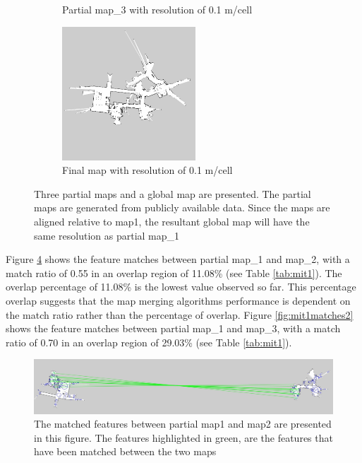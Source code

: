 \begin{figure}[H]
\begin{subfigure}{0.5\textwidth}
\caption{Partial map\_3 with resolution of 0.1 m/cell}
\label{fig:mit13}
\end{subfigure}
\begin{subfigure}{0.5\textwidth}
\centering
\includegraphics[width=0.9\linewidth, height=5cm]{figs/mit_results/a/final_map.jpg} 
\caption{Final map with resolution of 0.1 m/cell}
\label{fig:mit14}
\end{subfigure}
\caption{Three partial maps and a global map are presented. The partial maps are generated from publicly available data.  Since the maps are aligned relative to map1, the resultant global map will have the same resolution as partial map\_1}
\label{fig:mit1}
\end{figure}


Figure \ref{fig:mit1matches1} shows the feature matches between partial map\_1 and map\_2, with a match ratio of 0.55 in an overlap region of 11.08\% (see Table \ref{tab:mit1}). The overlap percentage of 11.08\% is the lowest value observed so far. This percentage overlap suggests that the map merging algorithms performance is dependent on the match ratio rather than the percentage of overlap. Figure \ref{fig:mit1matches2} shows the feature matches between partial map\_1 and map\_3, with a match ratio of 0.70 in an overlap region of 29.03\% (see Table \ref{tab:mit1}).


\begin{figure}[H]
    \centering
    \includegraphics[width=1\textwidth]{figs/mit_results/a/matchesPartialMap1Map2.jpg}
    \caption{The matched features between partial map1 and map2 are presented in this figure. The features highlighted in green, are the features that have been matched between the two maps}
    \label{fig:mit1matches1}
\end{figure} 

